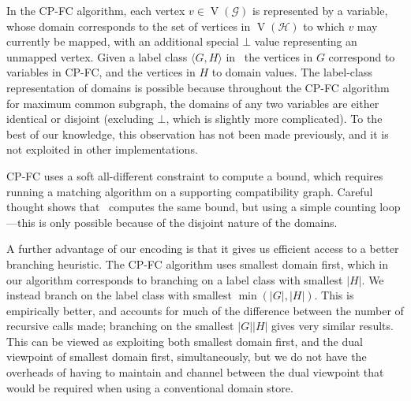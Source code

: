 \documentclass[letterpaper]{article}
\newcommand{\citep}[1]{\cite{#1}}
\newcommand{\McSplit}{\textproc{McSplit}}
\newcommand{\graphG}{\mathcal{G}}
\newcommand{\graphH}{\mathcal{H}}
\newcommand{\setG}{G}
\newcommand{\setH}{H}
\newcommand{\linerangeref}[2]{\count255=\ref{#1}\advance\count255 by 1 \ifnum\count255=\ref{#2}lines~\ref{#1} and~\ref{#2}\else lines~\ref{#1} to~\ref{#2}\fi}
\DeclareMathOperator{\V}{V}
\DeclareMathOperator{\N}{N}
\DeclareMathOperator{\invN}{\overline{N}}
\begin{document}
In the CP-FC algorithm, each vertex $v \in \V(\graphG)$ is represented by a
variable, whose domain corresponds to the set of vertices in $\V(\graphH)$ to
which $v$ may currently be mapped, with an additional special $\bot$ value
representing an unmapped vertex.  Given a label class $\langle \setG,\setH
\rangle$ in \McSplit\, the vertices in $\setG$ correspond to variables in
CP-FC, and the vertices in $\setH$ to domain values. The label-class
representation of domains is possible because throughout the CP-FC algorithm
for maximum common subgraph, the domains of any two variables are either
identical or disjoint (excluding $\bot$, which is slightly more complicated).
To the best of our knowledge, this observation has not been made previously,
and it is not exploited in other implementations.

CP-FC uses a soft all-different constraint to compute a bound, which requires
running a matching algorithm on a supporting compatibility graph.  Careful
thought shows that \McSplit\ computes the same bound, but using a simple
counting loop---this is only possible because of the disjoint nature of the
domains.


A further advantage of our encoding is that it gives us efficient access to a
better branching heuristic. The CP-FC algorithm uses smallest domain first,
which in our algorithm corresponds to branching on a label class with smallest
$|\setH|$. We instead branch on the label class with smallest $\min(|\setG|,|\setH|)$.
This is empirically better, and accounts for much of the difference between
the number of recursive calls made; branching on the smallest $|\setG| |\setH|$ gives
very similar results. This can be viewed as exploiting both smallest domain first,
and the dual viewpoint \citep{DBLP:conf/ecai/Geelen92} of smallest domain
first, simultaneously, but we do not have the overheads of having to maintain
and channel between the dual viewpoint that would be required when using a
conventional domain store.
\end{document}
